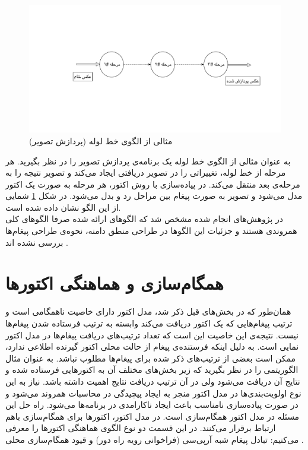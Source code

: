 \begin{figure}
    \begin{center}
	\includegraphics[width=16cm]{3-RelatedWork/Figures/pipeline.pdf}
    \end{center}
    \caption{\label{fig:pipeline}  مثالی از الگوی خط لوله (پردازش تصویر) }
\end{figure}
به عنوان مثالی از الگوی خط لوله یک برنامه‌ی پردازش تصویر را در نظر بگیرید. هر مرحله از خط لوله، تغییراتی را در تصویر دریافتی ایجاد می‌کند و تصویر نتیجه را به مرحله‌ی بعد منتقل می‌کند. در پیاده‌سازی با روش اکتور، هر مرحله به صورت یک اکتور مدل می‌شود و تصویر به صورت پیغام بین مراحل رد و بدل می‌شود. در شکل \ref{fig:pipeline} شمایی از این الگو نشان داده شده‌ است. \\
در پژوهش‌های انجام شده مشخص شد که الگوهای ارائه شده صرفا الگوهای کلی همروندی هستند و جزئیات این الگوها در طراحی منطق دامنه، نحوه‌ی طراحی پیغام‌ها بررسی نشده اند .

\section{ همگام‌سازی و هماهنگی اکتورها }
\label{section:coordinationAndSyncronization}
همان‌طور که در بخش‌های قبل ذکر شد،  مدل اکتور دارای خاصیت ناهمگامی‌ است و ترتیب پیغام‌هایی که یک اکتور دریافت می‌کند وابسته به ترتیب فرستاده شدن پیغام‌ها نیست. نتیجه‌ی این خاصیت این است که تعداد ترتیب‌های دریافت پیغام‌ها در مدل اکتور نمایی است\cite{KarmaniAgha_Actors_11}. به دلیل اینکه فرستنده‌ی پیغام از حالت محلی اکتور گیرنده اطلاعی ندارد، ممکن است بعضی از ترتیب‌های ذکر شده برای پیغام‌ها مطلوب نباشد. به عنوان مثال الگوریتمی را در نظر بگیرید که زیر بخش‌های مختلف آن به اکتور‌هایی فرستاده شده و نتایج آن دریافت می‌شود ولی در آن ترتیب دریافت نتایج اهمیت داشته باشد.  نیاز به این نوع اولویت‌بندی‌ها در مدل اکتور منجر به ایجاد پیچیدگی در محاسبات همروند می‌شود و در صورت پیاده‌سازی نامناسب باعث ایجاد ناکارامدی در برنامه‌ها می‌شود. راه حل این مسئله در مدل اکتور همگام‌سازی است. در مدل اکتور، اکتور‌ها برای همگام‌سازی باهم ارتباط برقرار می‌کنند. در این قسمت دو نوع الگوی هماهنگی اکتور‌ها را معرفی می‌کنیم: تبادل پیغام شبه آرپی‌سی (فراخوانی رویه راه دور) و قیود همگام‌سازی محلی . \cite{Agha1990,Agha93abstractionand,Papaioannou,KarmaniAgha_Actors_11} 
